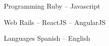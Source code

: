 

\begin{cvskills}

  \cvskill
    {Programming} %
    {Ruby – Javascript} %

  \cvskill
    {Web} %
    {Rails – ReactJS – AngularJS} %

  \cvskill
    {Languages} %
    {Spanish – English} %

\end{cvskills}
